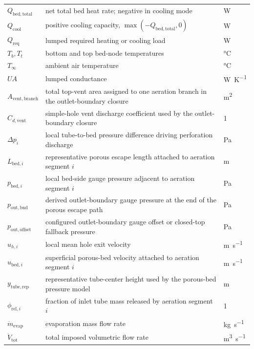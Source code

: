 \documentclass[11pt]{article}
\begin{document}
\begin{longtable}{@{}L{0.16\textwidth}L{0.60\textwidth}L{0.14\textwidth}@{}}
\(Q_{\mathrm{bed,total}}\) & net total bed heat rate; negative in cooling mode & \si{\watt} \\
\(Q_{\mathrm{cool}}\) & positive cooling capacity, \(\max(-Q_{\mathrm{bed,total}},0)\) & \si{\watt} \\
\(Q_{\mathrm{req}}\) & lumped required heating or cooling load & \si{\watt} \\
\(T_b,T_t\) & bottom and top bed-node temperatures & \si{\celsius} \\
\(T_\infty\) & ambient air temperature & \si{\celsius} \\
\(UA\) & lumped conductance & \si{\watt\per\kelvin} \\
\(A_{\mathrm{vent,branch}}\) & total top-vent area assigned to one aeration branch in the outlet-boundary closure & \si{\meter\squared} \\
\(C_{d,\mathrm{vent}}\) & simple-hole vent discharge coefficient used by the outlet-boundary closure & 1 \\
\(\Delta p_i\) & local tube-to-bed pressure difference driving perforation discharge & \si{\pascal} \\
\(L_{\mathrm{bed},i}\) & representative porous escape length attached to aeration segment \(i\) & \si{\meter} \\
\(p_{\mathrm{bed},i}\) & local bed-side gauge pressure adjacent to aeration segment \(i\) & \si{\pascal} \\
\(p_{\mathrm{out,bnd}}\) & derived outlet-boundary gauge pressure at the end of the porous escape path & \si{\pascal} \\
\(p_{\mathrm{out,offset}}\) & configured outlet-boundary gauge offset or closed-top fallback pressure & \si{\pascal} \\
\(u_{h,i}\) & local mean hole exit velocity & \si{\meter\per\second} \\
\(u_{\mathrm{bed},i}\) & superficial porous-bed velocity attached to aeration segment \(i\) & \si{\meter\per\second} \\
\(y_{\mathrm{tube,rep}}\) & representative tube-center height used by the porous-bed pressure model & \si{\meter} \\
\(\phi_{\mathrm{rel},i}\) & fraction of inlet tube mass released by aeration segment \(i\) & 1 \\
\(\dot m_{\mathrm{evap}}\) & evaporation mass flow rate & \si{\kilogram\per\second} \\
\(\dot V_{\mathrm{tot}}\) & total imposed volumetric flow rate & \si{\meter\cubed\per\second} \\
\bottomrule
\end{longtable}
\endgroup
\end{document}
